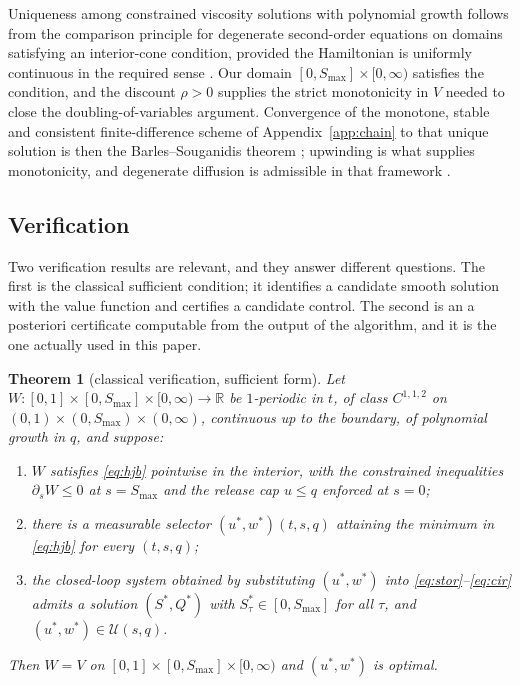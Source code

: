 \documentclass[pdflatex,sn-mathphys-num]{sn-jnl}
\theoremstyle{thmstyleone}
\newtheorem{theorem}{Theorem}[section]
\theoremstyle{thmstyletwo}
\theoremstyle{thmstylethree}
\newcommand{\R}{\mathbb{R}}
\begin{document}
\begin{appendices}
Uniqueness among constrained viscosity solutions with polynomial growth
follows from the comparison principle for degenerate second-order
equations on domains satisfying an interior-cone condition, provided the
Hamiltonian is uniformly continuous in the required sense
\citep{crandall1992,soner1986}. Our domain $[0,S_{\max}]\times[0,\infty)$
satisfies the condition, and the discount $\rho>0$ supplies the strict
monotonicity in $V$ needed to close the doubling-of-variables argument.
Convergence of the monotone, stable and consistent finite-difference scheme
of Appendix~\ref{app:chain} to that unique solution is then the
Barles--Souganidis theorem \citep{barles1991}; upwinding is what supplies
monotonicity, and degenerate diffusion is admissible in that framework
\citep{bonnans2003}.

\subsection{Verification}
\label{app:verification}

Two verification results are relevant, and they answer different questions.
The first is the classical sufficient condition; it identifies a candidate
smooth solution with the value function and certifies a candidate control.
The second is an a posteriori certificate computable from the output of the
algorithm, and it is the one actually used in this paper.

\begin{theorem}[classical verification, sufficient form]
\label{thm:verification}
Let $W:[0,1]\times[0,S_{\max}]\times[0,\infty)\to\R$ be $1$-periodic in
$t$, of class $C^{1,1,2}$ on
$(0,1)\times(0,S_{\max})\times(0,\infty)$, continuous up to the boundary,
of polynomial growth in $q$, and suppose:
\begin{enumerate}
\item[(i)] $W$ satisfies \eqref{eq:hjb} pointwise in the interior, with the
constrained inequalities
$\partial_s W\le0$ at $s=S_{\max}$ and the release cap $u\le q$ enforced at
$s=0$;
\item[(ii)] there is a measurable selector
$(u^*,w^*)(t,s,q)$ attaining the minimum in \eqref{eq:hjb} for every
$(t,s,q)$;
\item[(iii)] the closed-loop system obtained by substituting
$(u^*,w^*)$ into \eqref{eq:stor}--\eqref{eq:cir} admits a solution
$(S^*,Q^*)$ with $S^*_\tau\in[0,S_{\max}]$ for all $\tau$, and
$(u^*,w^*)\in\mathcal U(s,q)$.
\end{enumerate}
Then $W=V$ on $[0,1]\times[0,S_{\max}]\times[0,\infty)$ and $(u^*,w^*)$ is
optimal.
\end{theorem}


\end{appendices}
\end{document}
